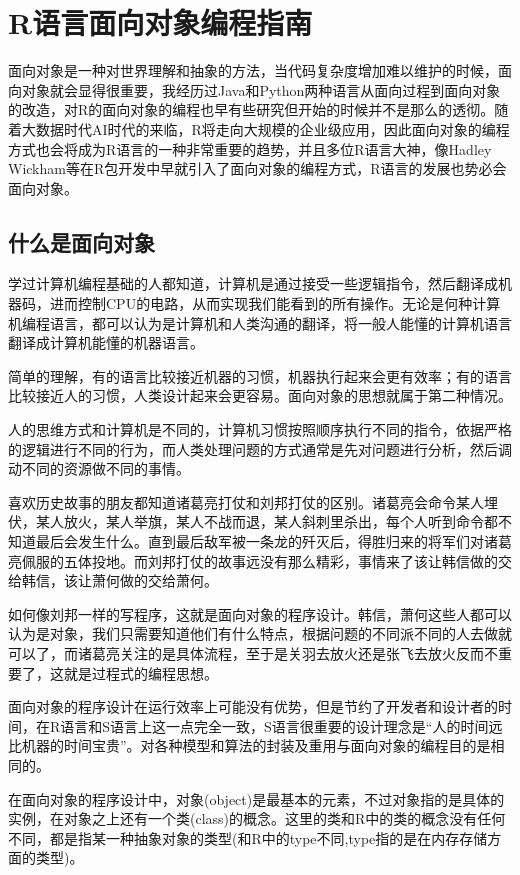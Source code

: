 \documentclass[]{book}
\begin{document}
\chapter{R语言面向对象编程指南}\label{ch2}

面向对象是一种对世界理解和抽象的方法，当代码复杂度增加难以维护的时候，面向对象就会显得很重要，我经历过Java和Python两种语言从面向过程到面向对象的改造，对R的面向对象的编程也早有些研究但开始的时候并不是那么的透彻。随着大数据时代AI时代的来临，R将走向大规模的企业级应用，因此面向对象的编程方式也会将成为R语言的一种非常重要的趋势，并且多位R语言大神，像Hadley
Wickham等在R包开发中早就引入了面向对象的编程方式，R语言的发展也势必会面向对象。

\section{什么是面向对象}

学过计算机编程基础的人都知道，计算机是通过接受一些逻辑指令，然后翻译成机器码，进而控制CPU的电路，从而实现我们能看到的所有操作。无论是何种计算机编程语言，都可以认为是计算机和人类沟通的翻译，将一般人能懂的计算机语言翻译成计算机能懂的机器语言。

简单的理解，有的语言比较接近机器的习惯，机器执行起来会更有效率；有的语言比较接近人的习惯，人类设计起来会更容易。面向对象的思想就属于第二种情况。

人的思维方式和计算机是不同的，计算机习惯按照顺序执行不同的指令，依据严格的逻辑进行不同的行为，而人类处理问题的方式通常是先对问题进行分析，然后调动不同的资源做不同的事情。

喜欢历史故事的朋友都知道诸葛亮打仗和刘邦打仗的区别。诸葛亮会命令某人埋伏，某人放火，某人举旗，某人不战而退，某人斜刺里杀出，每个人听到命令都不知道最后会发生什么。直到最后敌军被一条龙的歼灭后，得胜归来的将军们对诸葛亮佩服的五体投地。而刘邦打仗的故事远没有那么精彩，事情来了该让韩信做的交给韩信，该让萧何做的交给萧何。

如何像刘邦一样的写程序，这就是面向对象的程序设计。韩信，萧何这些人都可以认为是对象，我们只需要知道他们有什么特点，根据问题的不同派不同的人去做就可以了，而诸葛亮关注的是具体流程，至于是关羽去放火还是张飞去放火反而不重要了，这就是过程式的编程思想。

面向对象的程序设计在运行效率上可能没有优势，但是节约了开发者和设计者的时间，在R语言和S语言上这一点完全一致，S语言很重要的设计理念是``人的时间远比机器的时间宝贵''。对各种模型和算法的封装及重用与面向对象的编程目的是相同的。

在面向对象的程序设计中，对象(object)是最基本的元素，不过对象指的是具体的实例，在对象之上还有一个类(class)的概念。这里的类和R中的类的概念没有任何不同，都是指某一种抽象对象的类型(和R中的type不同,type指的是在内存存储方面的类型)。
\end{document}
